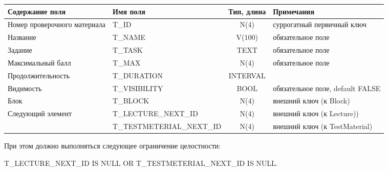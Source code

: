 \documentclass[a4paper,14pt]{article}
\begin{document}
\begin{table}[H]
	\begin{flushleft} 
	\end{flushleft}
	\begin{adjustbox}{width=\linewidth}
\begin{tabular}{|l|l|c|l|}
	\hline
	Содержание поля                    & Имя поля                  & Тип, длина & Примечания                       \\ \hline
	Номер проверочного материала       & T\_ID                     &    N(4)    & суррогатный первичный ключ       \\ \hline
	Название                           & T\_NAME                   &   V(100)   & обязательное поле                \\ \hline
	Задание                            & T\_TASK                   &    TEXT    & обязательное поле                \\ \hline
	Максимальный балл                  & T\_MAX                    &    N(4)    & обязательное поле                \\ \hline
	Продолжительность                  & T\_DURATION               &  INTERVAL  &                                  \\ \hline
	Видимость                          & T\_VISIBILITY             &    BOOL    & обязательное поле, default FALSE \\ \hline
	Блок                               & T\_BLOCK                  &    N(4)    & внешний ключ (к Block)           \\ \hline
	\multirow{2}{*}{Следующий элемент} & T\_LECTURE\_NEXT\_ID      &    N(4)    & внешний ключ (к Lecture))        \\ \cline{2-4}
	                                   & T\_TESTMETERIAL\_NEXT\_ID &    N(4)    & внешний ключ (к TestMaterial)    \\ \hline
\end{tabular}
	\end{adjustbox}
\end{table}

При этом должно выполняться следующее ограничение целостности: 

T\_LECTURE\_NEXT\_ID IS NULL OR T\_TESTMETERIAL\_NEXT\_ID IS NULL.

\end{document}
